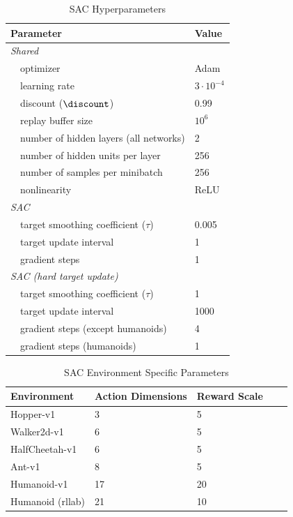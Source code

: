 \documentclass{article}
\begin{document}
\begin{table}[H]
\renewcommand{\arraystretch}{1.1}
\centering
\caption{SAC Hyperparameters}
\label{tab:shared_params}
\vspace{1mm}
\begin{tabular}{l l| l }
\toprule
\multicolumn{2}{l|}{Parameter} &  Value\\
\midrule
\multicolumn{2}{l|}{\it{Shared}}& \\
& optimizer &Adam \citep{kingma2014adam}\\
& learning rate & $3 \cdot 10^{-4}$\\
& discount ($\discount$) &  0.99\\
& replay buffer size & $10^6$\\
& number of hidden layers (all networks) & 2\\
& number of hidden units per layer & 256\\
& number of samples per minibatch & 256\\
& nonlinearity & ReLU\\
\midrule
\multicolumn{2}{l|}{\it{SAC}}& \\
& target smoothing coefficient ($\tau$)& 0.005\\
& target update interval & 1\\
& gradient steps & 1\\
\midrule
\multicolumn{2}{l|}{\it{SAC (hard target update)}}& \\
& target smoothing coefficient ($\tau$)& 1\\
& target update interval & 1000\\
& gradient steps (except humanoids)& 4\\
& gradient steps (humanoids)& 1\\
\bottomrule
\end{tabular}
\end{table}

\begin{table}[H]
\renewcommand{\arraystretch}{1.1}
\centering
\caption{SAC Environment Specific Parameters}
\label{tab:env_params}
\vspace{1mm}
\begin{tabular}{ l l l l l }
\toprule
Environment 		&Action Dimensions	&Reward Scale\\
\midrule
Hopper-v1 			&3		& 5\\
Walker2d-v1 		&6 		& 5\\
HalfCheetah-v1 		&6		& 5\\
Ant-v1 				&8		& 5\\
Humanoid-v1 	    &17 	& 20\\
Humanoid (rllab) 	&21 	& 10\\
\bottomrule
\end{tabular}
\end{table}
\end{document}
